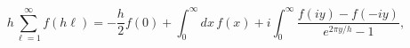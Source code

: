 \begin{equation}
h\sum _{\ell =1}^{\infty }f\left(h\ell \right)=-\frac{h}{2}f\left(0\right)+\int _{0}^{\infty }dx\, f\left(x\right)+i\int _{0}^{\infty }\frac{f\left(iy\right)-f\left(-iy\right)}{e^{2\pi y/h}-1},\label{Abel-Plana}\end{equation}

